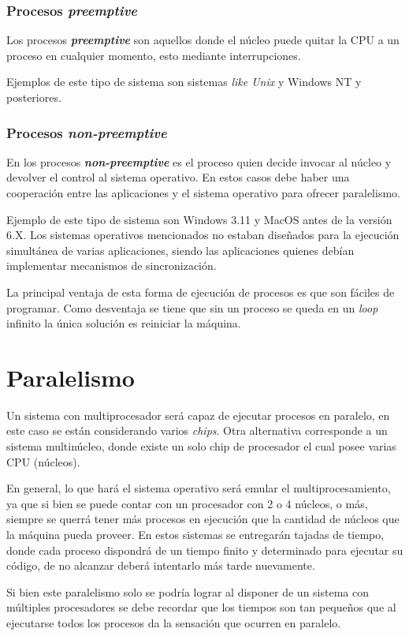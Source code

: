\subsubsection{Procesos \textit{preemptive}}
Los procesos \textbf{\textit{preemptive}} son aquellos donde el núcleo puede
quitar la CPU a un proceso en cualquier momento, esto mediante interrupciones.

Ejemplos de este tipo de sistema son sistemas \textit{like Unix} y Windows NT y
posteriores.

\subsubsection{Procesos \textit{non-preemptive}}
En los procesos \textbf{\textit{non-preemptive}} es el proceso quien decide
invocar al núcleo y devolver el control al sistema operativo. En estos casos
debe haber una cooperación entre las aplicaciones y el sistema operativo para
ofrecer paralelismo.

Ejemplo de este tipo de sistema son Windows 3.11 y MacOS antes de la versión
6.X. Los sistemas operativos mencionados no estaban diseñados para la ejecución
simultánea de varias aplicaciones, siendo las aplicaciones quienes debían
implementar mecanismos de sincronización.

La principal ventaja de esta forma de ejecución de procesos es que son fáciles
de programar. Como desventaja se tiene que sin un proceso se queda en un
\textit{loop} infinito la única solución es reiniciar la máquina.

\section{Paralelismo}
Un sistema con multiprocesador será capaz de ejecutar procesos en paralelo, en
este caso se están considerando varios \textit{chips}. Otra alternativa
corresponde a un sistema multinúcleo, donde existe un solo chip de procesador el
cual posee varias CPU (núcleos).

En general, lo que hará el sistema operativo será emular el multiprocesamiento,
ya que si bien se puede contar con un procesador con 2 o 4 núcleos, o más,
siempre se querrá tener más procesos en ejecución que la cantidad de núcleos que
la máquina pueda proveer. En estos sistemas se entregarán tajadas de tiempo,
donde cada proceso dispondrá de un tiempo finito y determinado para ejecutar su
código, de no alcanzar deberá intentarlo más tarde nuevamente.

Si bien este paralelismo solo se podría lograr al disponer de un sistema con
múltiples procesadores se debe recordar que los tiempos son tan pequeños que al
ejecutarse todos los procesos da la sensación que ocurren en paralelo.

